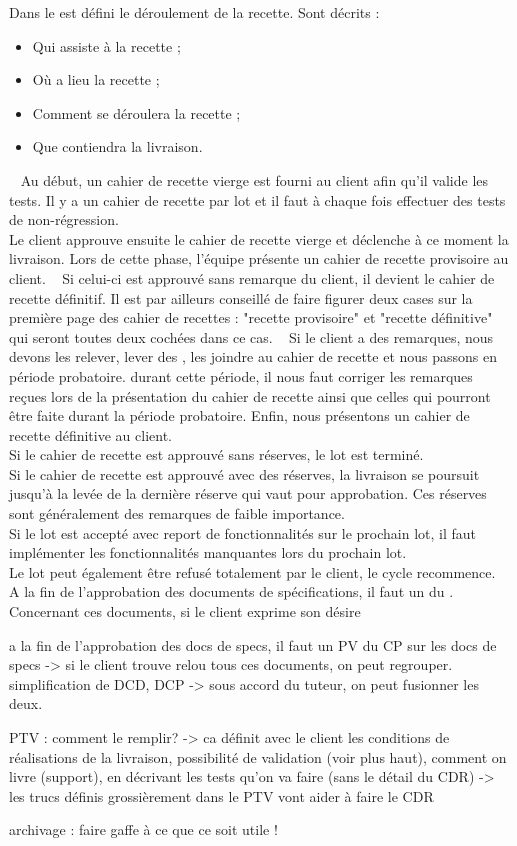 \documentclass [a4paper] {article}
\begin{document}
Dans le \PTV{} est défini le déroulement de la recette. Sont décrits :
\begin{itemize}
\item Qui assiste à la recette ;
\item Où a lieu la recette ;
\item Comment se déroulera la recette ;
\item Que contiendra la livraison.
\end{itemize}
~
Au début, un cahier de recette vierge est fourni au client afin qu'il valide les tests. Il y a un cahier de recette par lot et il faut à chaque fois effectuer des tests de non-régression.
\\
Le client approuve ensuite le cahier de recette vierge et déclenche à ce moment la livraison. Lors de cette phase, l'équipe présente un cahier de recette provisoire au client.
~
Si celui-ci est approuvé sans remarque du client, il devient le cahier de recette définitif. Il est par ailleurs conseillé de faire figurer deux cases sur la première page des cahier de recettes : "recette provisoire" et "recette définitive" qui seront toutes deux cochées dans ce cas.
~
Si le client a des remarques, nous devons les relever, lever des \FFT{}, les joindre au cahier de recette et nous passons en période probatoire. durant cette période, il nous faut corriger les remarques reçues lors de la présentation du cahier de recette ainsi que celles qui pourront être faite durant la période probatoire. Enfin, nous présentons un cahier de recette définitive au client.
\\
Si le cahier de recette est approuvé sans réserves, le lot est terminé.
\\
Si le cahier de recette est approuvé avec des réserves, la livraison se poursuit jusqu'à la levée de la dernière réserve qui vaut pour approbation. Ces réserves sont généralement des remarques de faible importance.
\\
Si le lot est accepté avec report de fonctionnalités sur le prochain lot, il faut implémenter les fonctionnalités manquantes lors du prochain lot.
\\
Le lot peut également être refusé totalement par le client, le cycle recommence.
~
A la fin de l'approbation des documents de spécifications, il faut un \PV{} du \CP{}. Concernant ces documents, si le client exprime son désire 



a la fin de l'approbation des docs de specs, il faut un PV du CP 
sur les docs de specs -> si le client trouve relou tous ces documents, on peut regrouper.
simplification de DCD, DCP -> sous accord du tuteur, on peut fusionner les deux.

PTV : comment le remplir? -> ca définit avec le client les conditions de réalisations de la livraison, possibilité de validation (voir plus haut), comment on livre (support), en décrivant les tests qu'on va faire (sans le détail du CDR) -> les trucs définis grossièrement dans le PTV vont aider à faire le CDR

archivage : faire gaffe à ce que ce soit utile !
\end{document}
